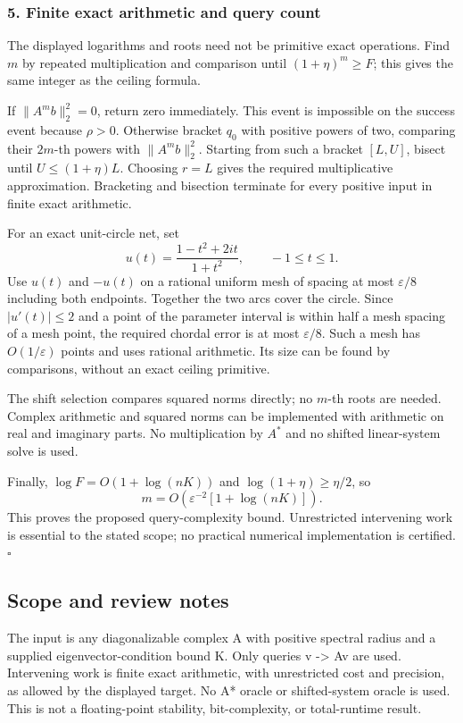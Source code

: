 \documentclass[10pt,a4paper]{article}
\begin{document}
\subsubsection{5. Finite exact arithmetic and query
count}\label{finite-exact-arithmetic-and-query-count}

The displayed logarithms and roots need not be primitive exact
operations. Find \(m\) by repeated multiplication and comparison until
\((1+\eta)^m\ge F\); this gives the same integer as the ceiling formula.

If \(\|A^mb\|_2^2=0\), return zero immediately. This event is impossible
on the success event because \(\rho>0\). Otherwise bracket \(q_0\) with
positive powers of two, comparing their \(2m\)-th powers with
\(\|A^mb\|_2^2\). Starting from such a bracket \([L,U]\), bisect until
\(U\le(1+\eta)L\). Choosing \(r=L\) gives the required multiplicative
approximation. Bracketing and bisection terminate for every positive
input in finite exact arithmetic.

For an exact unit-circle net, set \[
u(t)=\frac{1-t^2+2it}{1+t^2},\qquad -1\le t\le1.
\] Use \(u(t)\) and \(-u(t)\) on a rational uniform mesh of spacing at
most \(\varepsilon/8\) including both endpoints. Together the two arcs
cover the circle. Since \(|u'(t)|\le2\) and a point of the parameter
interval is within half a mesh spacing of a mesh point, the required
chordal error is at most \(\varepsilon/8\). Such a mesh has
\(O(1/\varepsilon)\) points and uses rational arithmetic. Its size can
be found by comparisons, without an exact ceiling primitive.

The shift selection compares squared norms directly; no \(m\)-th roots
are needed. Complex arithmetic and squared norms can be implemented with
arithmetic on real and imaginary parts. No multiplication by \(A^*\) and
no shifted linear-system solve is used.

Finally, \(\log F=O(1+\log(nK))\) and \(\log(1+\eta)\ge\eta/2\), so \[
m=O\!\left(\varepsilon^{-2}[1+\log(nK)]\right).
\] This proves the proposed query-complexity bound. Unrestricted
intervening work is essential to the stated scope; no practical
numerical implementation is certified. \(\square\)

\subsection{Scope and review notes}\label{scope-and-review-notes}

The input is any diagonalizable complex A with positive spectral radius
and a supplied eigenvector-condition bound K. Only queries v
-\textgreater{} Av are used. Intervening work is finite exact
arithmetic, with unrestricted cost and precision, as allowed by the
displayed target. No A* oracle or shifted-system oracle is used. This is
not a floating-point stability, bit-complexity, or total-runtime result.
\end{document}
